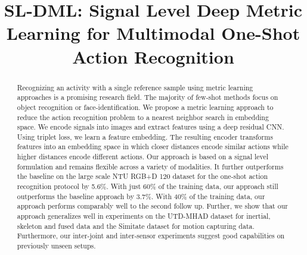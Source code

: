 \documentclass[10pt,conference,a4paper]{IEEEtran}
\def\ntuoneshotimpro{5.6}
\def\ntuoneshotimproreduced{3.7} \def\ntuoneshotimprosecond{8}
\begin{document}
\title{SL-DML: Signal Level Deep Metric Learning for Multimodal One-Shot Action Recognition}




\author{
}


\maketitle

\begin{abstract}
Recognizing an activity with a single reference sample using metric learning approaches is a promising research field. The majority of few-shot methods focus on object recognition or face-identification. 
We propose a metric learning approach to reduce the action recognition problem to a nearest neighbor search in embedding space. 
We encode signals into images and extract features using a deep residual CNN. Using triplet loss, we learn a feature embedding. The resulting encoder transforms features into an embedding space in which closer distances encode similar actions while higher distances encode different actions.
Our approach is based on a signal level formulation and remains flexible across a variety of modalities. It further outperforms the baseline on the large scale NTU RGB+D 120 dataset for the one-shot action recognition protocol by \ntuoneshotimpro\%. With just 60\% of the training data, our approach still outperforms the baseline approach by \ntuoneshotimproreduced\%. With 40\% of the training data, our approach performs comparably well to the second follow up.
Further, we show that our approach generalizes well in experiments on the UTD-MHAD dataset for inertial, skeleton and fused data and the Simitate dataset for motion capturing data. 
Furthermore, our inter-joint and inter-sensor experiments suggest good capabilities on previously unseen setups.
\end{abstract} 





\IEEEpeerreviewmaketitle
\end{document}

